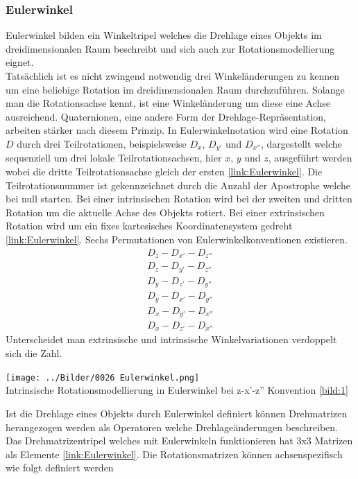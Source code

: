 \subsubsection{Eulerwinkel}
Eulerwinkel bilden ein Winkeltripel welches die Drehlage eines Objekts im dreidimensionalen Raum beschreibt und sich auch zur Rotationsmodellierung eignet.\\
Tatsächlich ist es nicht zwingend notwendig drei Winkeländerungen zu kennen um eine beliebige Rotation im dreidimensionalen Raum durchzuführen. Solange man die Rotationsachse kennt, ist eine Winkeländerung um diese eine Achse ausreichend. Quaternionen, eine andere Form der Drehlage-Repräsentation, arbeiten stärker nach diesem Prinzip. In Eulerwinkelnotation wird eine Rotation $D$ durch drei Teilrotationen, beispielsweise $D_x$, $D_{y'}$ und $D_{x''}$, dargestellt welche sequenziell um drei lokale Teilrotationsachsen, hier $x$, $y$ und $z$, ausgeführt werden wobei die dritte Teilrotationsachse gleich der ersten \ref{link:Eulerwinkel}. Die Teilrotationsnummer ist gekennzeichnet durch die Anzahl der Apostrophe welche bei null starten.
Bei einer intrinsischen Rotation wird bei der zweiten und dritten Rotation um die aktuelle Achse des Objekts rotiert. Bei einer extrinsischen Rotation wird um ein fixes kartesisches Koordinatensystem gedreht \ref{link:Eulerwinkel}.
Sechs Permutationen von Eulerwinkelkonventionen existieren.
\begin{align}
	D_z-D_{x'}-D_{z''}\\
	D_z-D_{y'}-D_{z''}\\
	D_y-D_{z'}-D_{y''}\\
	D_y-D_{x'}-D_{y''}\\
	D_x-D_{y'}-D_{x''}\\
	D_x-D_{z'}-D_{x''}
\end{align}
Unterscheidet man extrinsische und intrinsische Winkelvariationen verdoppelt sich die Zahl.
\begin{center}
	\texttt{[image: ../Bilder/0026 Eulerwinkel.png]}{\\Intrinsische Rotationsmodellierung in Eulerwinkel bei z-x'-z'' Konvention \ref{bild:1}}
\end{center}
Ist die Drehlage eines Objekts durch Eulerwinkel definiert können Drehmatrizen herangezogen werden als Operatoren welche Drehlageänderungen beschreiben. Das Drehmatrizentripel welches mit Eulerwinkeln funktionieren hat 3x3 Matrizen als Elemente \ref{link:Eulerwinkel}. Die Rotationsmatrizen können achsenspezifisch wie folgt definiert werden
